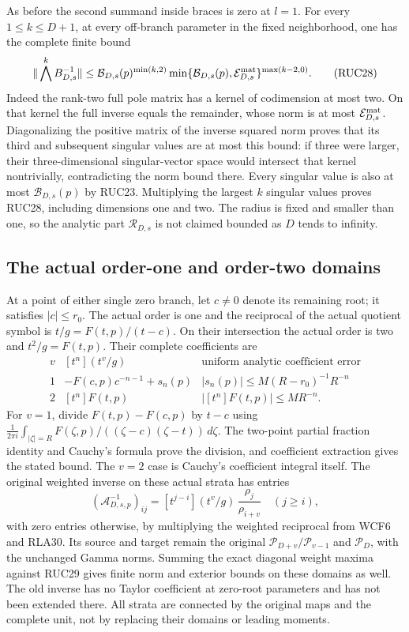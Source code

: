 As before the second summand inside braces is zero at $l=1$.
For every $1\le k\le D+1$, at every off-branch parameter in the
fixed neighborhood, one has the complete finite bound
\[
 \|\bigwedge^k B_{D,s}^{-1}\|
 \le \mathcal B_{D,s}(p)^{\min(k,2)}
      \min\{\mathcal B_{D,s}(p),\mathcal E_{D,s}^{\rm mat}\}
                                      ^{\max(k-2,0)}.
 \tag{RUC28}
\]
Indeed the rank-two full pole matrix has a kernel of codimension
at most two.  On that kernel the full inverse equals the remainder,
whose norm is at most $\mathcal E_{D,s}^{\rm mat}$.  Diagonalizing
the positive matrix of the inverse squared norm proves that its
third and subsequent singular values are at most this bound: if
three were larger, their three-dimensional singular-vector space
would intersect that kernel nontrivially, contradicting the norm
bound there.  Every singular value is also at most
$\mathcal B_{D,s}(p)$ by RUC23.  Multiplying the largest $k$
singular values proves RUC28, including dimensions one and two.
The radius is fixed and smaller than one, so the analytic part
$\mathcal R_{D,s}$ is not claimed bounded as $D$ tends to infinity.

\subsection{The actual order-one and order-two domains}

At a point of either single zero branch, let $c\ne0$ denote its
remaining root; it satisfies $|c|\le r_0$.  The actual order is
one and the reciprocal of the actual quotient symbol is
$t/g=F(t,p)/(t-c)$.  On their intersection the actual order is
two and $t^2/g=F(t,p)$.  Their complete coefficients are
\[
 \begin{array}{c|c|c}
 v&[t^n](t^v/g)&\text{uniform analytic coefficient error}\\\hline
 1&-F(c,p)c^{-n-1}+s_n(p)&
 |s_n(p)|\le M(R-r_0)^{-1}R^{-n}\\[2pt]
 2&[t^n]F(t,p)&|[t^n]F(t,p)|\le MR^{-n}.
 \end{array}\tag{RUC29}
\]
For $v=1$, divide $F(t,p)-F(c,p)$ by $t-c$ using
$\frac1{2\pi i}\int_{|\zeta|=R}
F(\zeta,p)/((\zeta-c)(\zeta-t))\,d\zeta$.
The two-point partial fraction identity and Cauchy's formula
prove the division, and coefficient extraction gives the stated
bound.  The $v=2$ case is Cauchy's coefficient integral itself.
The original weighted inverse on these actual strata has entries
\[
 (\mathcal A_{D,s,p}^{-1})_{ij}
     =[t^{j-i}](t^v/g)\,\frac{\rho_j}{\rho_{i+v}}\quad(j\ge i),
 \tag{RUC30}
\]
with zero entries otherwise, by multiplying the weighted reciprocal
from WCF6 and RLA30.  Its source and target remain the original
$\mathcal P_{D+v}/\mathcal P_{v-1}$ and $\mathcal P_D$, with
the unchanged Gamma norms.  Summing the exact diagonal weight
maxima against RUC29 gives finite norm and exterior bounds on
these domains as well.  The old inverse has no Taylor coefficient
at zero-root parameters and has not been extended there.  All
strata are connected by the original maps and the complete unit,
not by replacing their domains or leading moments.
